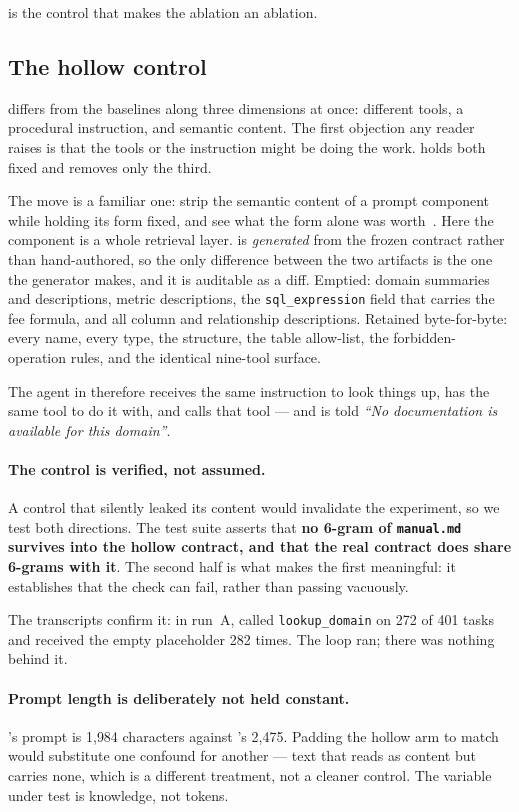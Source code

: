 \armH{} is the control that makes the ablation an ablation.

\subsection{The hollow control}
\label{sec:hollow}

\armC{} differs from the baselines along three dimensions at once:
different tools, a procedural instruction, and semantic content. The first
objection any reader raises is that the tools or the instruction might be doing
the work. \armH{} holds both fixed and removes only the third.

The move is a familiar one: strip the semantic content of a prompt component
while holding its form fixed, and see what the form alone was
worth~\cite{min-demonstrations}. Here the component is a whole retrieval layer.
\armH{} is \emph{generated} from the frozen contract rather than hand-authored,
so the only difference between the two artifacts is the one the generator
makes, and it is auditable as a diff.
Emptied: domain summaries and descriptions, metric descriptions, the
\texttt{sql\_expression} field that carries the fee formula, and all column and
relationship descriptions. Retained byte-for-byte: every name, every type, the
structure, the table allow-list, the forbidden-operation rules, and the
identical nine-tool surface.

The agent in \armH{} therefore receives the same instruction to look things up,
has the same tool to do it with, and calls that tool --- and is told
\emph{``No documentation is available for this domain''}.

\paragraph{The control is verified, not assumed.} A control that silently
leaked its content would invalidate the experiment, so we test both directions.
The test suite asserts that \textbf{no 6-gram of \texttt{manual.md} survives
into the hollow contract, and that the real contract does share 6-grams with
it}. The second half is what makes the first meaningful: it establishes that
the check can fail, rather than passing vacuously.

The transcripts confirm it: in run~A, \armH{} called \texttt{lookup\_domain}
on 272 of 401 tasks and received the empty placeholder 282 times. The loop
ran; there was nothing behind it.

\paragraph{Prompt length is deliberately not held constant.} \armH{}'s prompt
is 1{,}984 characters against \armC{}'s 2{,}475. Padding the hollow arm to
match would
substitute one confound for another --- text that reads as content but carries
none, which is a different treatment, not a cleaner control. The variable under
test is knowledge, not tokens.

